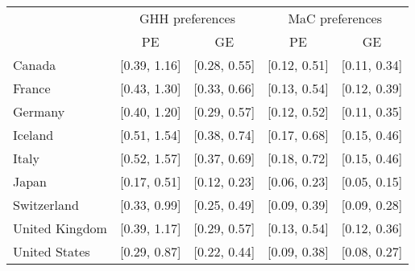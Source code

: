 \begin{tabular}{lcccc} 
& \multicolumn{2}{c}{GHH preferences}   & \multicolumn{2}{c}{MaC preferences}   \tabularnewline 
& PE                & GE                & PE                & GE                \tabularnewline 
\hline 
\hline 
Canada & {[}0.39, 1.16{]} & {[}0.28, 0.55{]} & {[}0.12, 0.51{]} & {[}0.11, 0.34{]} \tabularnewline 
France & {[}0.43, 1.30{]} & {[}0.33, 0.66{]} & {[}0.13, 0.54{]} & {[}0.12, 0.39{]} \tabularnewline 
Germany & {[}0.40, 1.20{]} & {[}0.29, 0.57{]} & {[}0.12, 0.52{]} & {[}0.11, 0.35{]} \tabularnewline 
Iceland & {[}0.51, 1.54{]} & {[}0.38, 0.74{]} & {[}0.17, 0.68{]} & {[}0.15, 0.46{]} \tabularnewline 
Italy & {[}0.52, 1.57{]} & {[}0.37, 0.69{]} & {[}0.18, 0.72{]} & {[}0.15, 0.46{]} \tabularnewline 
Japan & {[}0.17, 0.51{]} & {[}0.12, 0.23{]} & {[}0.06, 0.23{]} & {[}0.05, 0.15{]} \tabularnewline 
Switzerland & {[}0.33, 0.99{]} & {[}0.25, 0.49{]} & {[}0.09, 0.39{]} & {[}0.09, 0.28{]} \tabularnewline 
United Kingdom & {[}0.39, 1.17{]} & {[}0.29, 0.57{]} & {[}0.13, 0.54{]} & {[}0.12, 0.36{]} \tabularnewline 
United States & {[}0.29, 0.87{]} & {[}0.22, 0.44{]} & {[}0.09, 0.38{]} & {[}0.08, 0.27{]} \tabularnewline 
\hline 
\end{tabular} 
